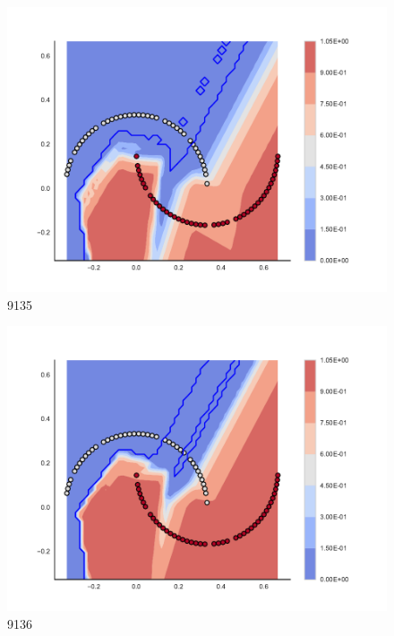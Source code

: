 \begin{subfigure}[b]{0.09\textwidth}
    \includegraphics[clip, trim=2.35cm 1.75cm 4.5cm 0cm,width=\textwidth]{img/convergence/9135.pdf}
    \caption{9135}
    \label{fig:convergence_9135}
\end{subfigure}
%
\begin{subfigure}[b]{0.09\textwidth}
    \includegraphics[clip, trim=2.35cm 1.75cm 4.5cm 0cm,width=\textwidth]{img/convergence/9136.pdf}
    \caption{9136}
    \label{fig:convergence_9136}
\end{subfigure}
%

